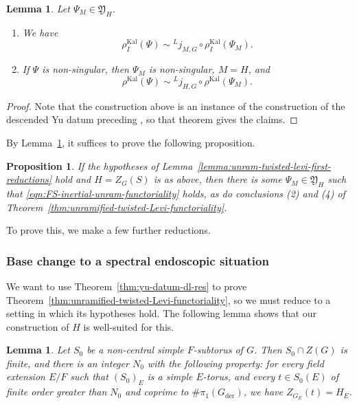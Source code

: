 \documentclass[reqno]{amsart}
\numberwithin{equation}{subsection}
\newcommand{\ld}{{}^L}
\DeclareMathOperator{\Kal}{Kal}
\DeclareMathOperator{\der}{der}
\newtheorem{lemma}[thm]{Lemma}
\newtheorem{prop}[thm]{Proposition}
\theoremstyle{remark}
\numberwithin{equation}{subsection}
\numberwithin{figure}{subsection}
\begin{document}
\begin{lemma}\label{lemma:candidate-data-properties}
Let $\Psi_M \in \mathfrak{Y}_H$.
\begin{enumerate}
\item We have
\[
    \rho_I^{\Kal}(\Psi) \sim \ld j_{M,G} \circ \rho_I^{\Kal}(\Psi_M).
\]
\item If $\Psi$ is non-singular, then $\Psi_M$ is non-singular, $M = H$, and
\[
    \rho^{\Kal}(\Psi) \sim \ld j_{H,G} \circ \rho^{\Kal}(\Psi_M).
\]
\end{enumerate}
\end{lemma}

\begin{proof}
Note that the construction above is an instance of the construction of the descended Yu datum preceding \cite[Theorem~9.3.3]{CF26a}, so that theorem gives the claims.
\end{proof}

By Lemma~\ref{lemma:candidate-data-properties}, it suffices to prove the following proposition. 

\begin{prop}\label{prop:unram-twisted-levi-heart}
    If the hypotheses of Lemma~\ref{lemma:unram-twisted-levi-first-reductions} hold and $H = Z_G(S)$ is as above, then there is some $\Psi_M \in \mathfrak Y_H$ such that \eqref{eqn:FS-inertial-unram-functoriality} holds, as do conclusions (2) and (4) of Theorem~\ref{thm:unramified-twisted-Levi-functoriality}.
\end{prop}

To prove this, we make a few further reductions.

\subsubsection{Base change to a spectral endoscopic situation}

We want to use Theorem~\ref{thm:yu-datum-dl-res} to prove Theorem~\ref{thm:unramified-twisted-Levi-functoriality}, so we must reduce to a setting in which its hypotheses hold. The following lemma shows that our construction of $H$ is well-suited for this.

\begin{lemma}\label{lemma:simple-tori-centralizers}
Let $S_0$ be a non-central simple $F$-subtorus of $G$. Then $S_0 \cap Z(G)$ is finite, and there is an integer $N_0$ with the following property: for every field extension $E/F$ such that $(S_0)_E$ is a simple $E$-torus, and every $t \in S_0(E)$ of finite order greater than $N_0$ and coprime to $\#\pi_1(G_{\der})$, we have $Z_{G_E}(t) = H_E$.
\end{lemma}
\end{document}
